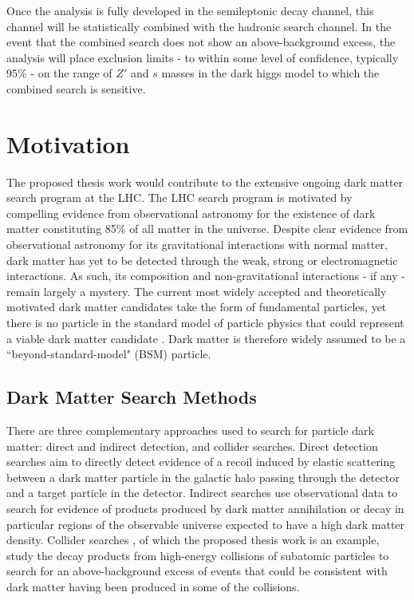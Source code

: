 \documentclass[12pt]{article}
\begin{document}
Once the analysis is fully developed in the semileptonic decay channel, this channel will be statistically combined with the hadronic search channel. In the event that the combined search does not show an above-background excess, the analysis will place exclusion limits - to within some level of confidence, typically 95\% - on the range of $Z'$ and $s$ masses in the dark higgs model to which the combined search is sensitive.

\newpage

\section{Motivation}

The proposed thesis work would contribute to the extensive ongoing dark matter search program at the LHC. The LHC search program is motivated by compelling evidence from observational astronomy for the existence of dark matter constituting 85\% \cite{planck} of all matter in the universe. Despite clear evidence from observational astronomy for its gravitational interactions with normal matter, dark matter has yet to be detected through the weak, strong or electromagnetic interactions. As such, its composition and non-gravitational interactions - if any - remain largely a mystery. The current most widely accepted and theoretically motivated dark matter candidates take the form of fundamental particles, yet there is no particle in the standard model of particle physics that could represent a viable dark matter candidate \cite{feng}. Dark matter is therefore widely assumed to be a ``beyond-standard-model" (BSM) particle. 

\subsection{Dark Matter Search Methods}
There are three complementary approaches used to search for particle dark matter: direct and indirect detection, and collider searches. Direct detection searches \cite{Schumann_2019, 2015gya} aim to directly detect evidence of a recoil induced by elastic scattering between a dark matter particle in the galactic halo passing through the detector and a target particle in the detector. Indirect searches \cite{CIRELLI_2012, conrad} use observational data to search for evidence of products produced by dark matter annihilation or decay in particular regions of the observable universe expected to have a high dark matter density. Collider searches \cite{DM_colliders}, of which the proposed thesis work is an example, study the decay products from high-energy collisions of subatomic particles to search for an above-background excess of events that could be consistent with dark matter having been produced in some of the collisions.
\end{document}
